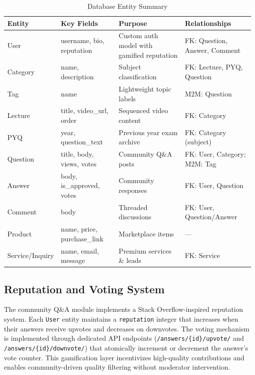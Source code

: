 \documentclass[conference]{IEEEtran}
\begin{document}
\begin{table}[t]
\caption{Database Entity Summary}
\label{tab:datamodel}
\begin{center}
\begin{tabular}{p{2.0cm}p{3.5cm}p{4.5cm}p{3.5cm}}
\toprule
\textbf{Entity} & \textbf{Key Fields} & \textbf{Purpose} & \textbf{Relationships} \\
\midrule
User & username, bio, reputation & Custom auth model with gamified reputation & FK: Question, Answer, Comment \\
Category & name, description & Subject classification & FK: Lecture, PYQ, Question \\
Tag & name & Lightweight topic labels & M2M: Question \\
Lecture & title, video\_url, order & Sequenced video content & FK: Category \\
PYQ & year, question\_text & Previous year exam archive & FK: Category (subject) \\
Question & title, body, views, votes & Community Q\&A posts & FK: User, Category; M2M: Tag \\
Answer & body, is\_approved, votes & Community responses & FK: User, Question \\
Comment & body & Threaded discussions & FK: User, Question/Answer \\
Product & name, price, purchase\_link & Marketplace items & --- \\
Service/Inquiry & name, email, message & Premium services \& leads & FK: Service \\
\bottomrule
\end{tabular}
\end{center}
\end{table}

\subsection{Reputation and Voting System}
The community Q\&A module implements a Stack Overflow-inspired reputation system. Each \texttt{User} entity maintains a \texttt{reputation} integer that increases when their answers receive upvotes and decreases on downvotes. The voting mechanism is implemented through dedicated API endpoints (\texttt{/answers/\{id\}/upvote/} and \texttt{/answers/\{id\}/downvote/}) that atomically increment or decrement the answer's vote counter. This gamification layer incentivizes high-quality contributions and enables community-driven quality filtering without moderator intervention.
\end{document}
